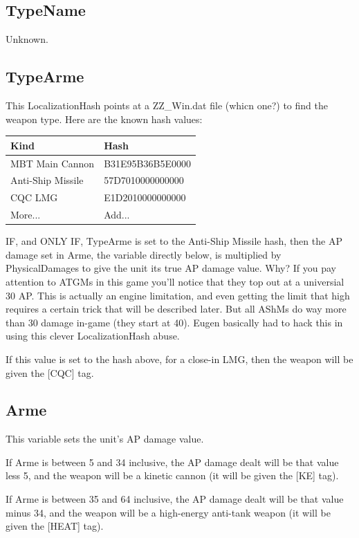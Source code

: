 \documentclass{article}
\begin{document}
\subsection{TypeName}

Unknown.

\subsection{TypeArme}

This LocalizationHash points at a ZZ\_Win.dat file (whicn one?) to find the weapon type. Here are the known hash values:

\begin{center}
    \begin{tabular}{ | l | l |}
    \hline
	Kind & Hash\\ \hline
	MBT Main Cannon & B31E95B36B5E0000\\
	Anti-Ship Missile & 57D7010000000000\\
	CQC LMG & E1D2010000000000\\
	More... & Add...\\
    \hline
    \end{tabular}
\end{center}

IF, and ONLY IF, TypeArme is set to the Anti-Ship Missile hash, then the AP damage set in Arme, the variable directly below, is multiplied by PhysicalDamages to give the unit its true AP damage value. Why? If you pay attention to ATGMs in this game you'll notice that they top out at a universial 30 AP. This is actually an engine limitation, and even getting the limit that high requires a certain trick that will be described later. But all AShMs do way more than 30 damage in-game (they start at 40). Eugen basically had to hack this in using this clever LocalizationHash abuse.

If this value is set to the hash above, for a close-in LMG, then the weapon will be given the [CQC] tag.

\subsection{Arme}

This variable sets the unit's AP damage value.

If Arme is between 5 and 34 inclusive, the AP damage dealt will be that value less 5, and the weapon will be a kinetic cannon (it will be given the [KE] tag).

If Arme is between 35 and 64 inclusive, the AP damage dealt will be that value minus 34, and the weapon will be a high-energy anti-tank weapon (it will be given the [HEAT] tag).
\end{document}
